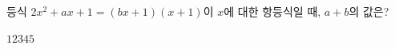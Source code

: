 등식 $2x^2+ax+1=(bx+1)(x+1)$이 $x$에 대한 항등식일 때, $a+b$의 값은? 
\begin{choices32}{$1$}{$2$}{$3$}{$4$}{$5$}\end{choices32}
